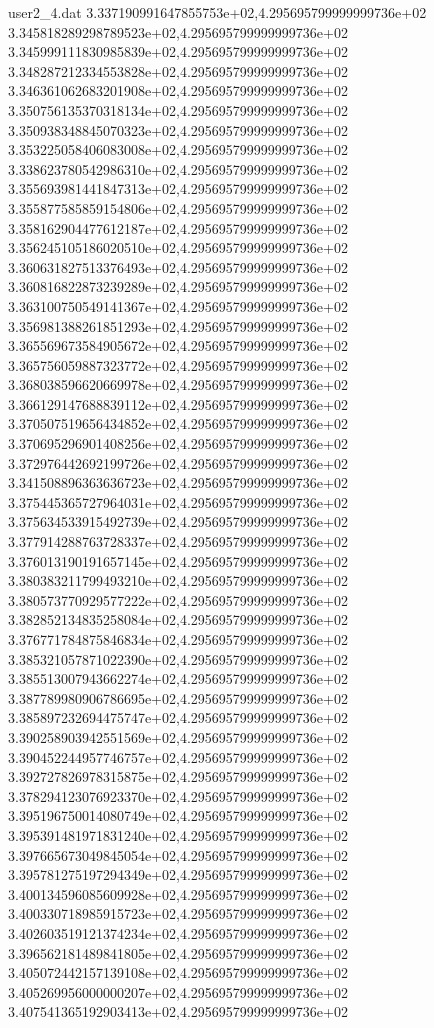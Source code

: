 \begin{filecontents}{user2_4.dat}
3.337190991647855753e+02,4.295695799999999736e+02
3.345818289298789523e+02,4.295695799999999736e+02
3.345999111830985839e+02,4.295695799999999736e+02
3.348287212334553828e+02,4.295695799999999736e+02
3.346361062683201908e+02,4.295695799999999736e+02
3.350756135370318134e+02,4.295695799999999736e+02
3.350938348845070323e+02,4.295695799999999736e+02
3.353225058406083008e+02,4.295695799999999736e+02
3.338623780542986310e+02,4.295695799999999736e+02
3.355693981441847313e+02,4.295695799999999736e+02
3.355877585859154806e+02,4.295695799999999736e+02
3.358162904477612187e+02,4.295695799999999736e+02
3.356245105186020510e+02,4.295695799999999736e+02
3.360631827513376493e+02,4.295695799999999736e+02
3.360816822873239289e+02,4.295695799999999736e+02
3.363100750549141367e+02,4.295695799999999736e+02
3.356981388261851293e+02,4.295695799999999736e+02
3.365569673584905672e+02,4.295695799999999736e+02
3.365756059887323772e+02,4.295695799999999736e+02
3.368038596620669978e+02,4.295695799999999736e+02
3.366129147688839112e+02,4.295695799999999736e+02
3.370507519656434852e+02,4.295695799999999736e+02
3.370695296901408256e+02,4.295695799999999736e+02
3.372976442692199726e+02,4.295695799999999736e+02
3.341508896363636723e+02,4.295695799999999736e+02
3.375445365727964031e+02,4.295695799999999736e+02
3.375634533915492739e+02,4.295695799999999736e+02
3.377914288763728337e+02,4.295695799999999736e+02
3.376013190191657145e+02,4.295695799999999736e+02
3.380383211799493210e+02,4.295695799999999736e+02
3.380573770929577222e+02,4.295695799999999736e+02
3.382852134835258084e+02,4.295695799999999736e+02
3.376771784875846834e+02,4.295695799999999736e+02
3.385321057871022390e+02,4.295695799999999736e+02
3.385513007943662274e+02,4.295695799999999736e+02
3.387789980906786695e+02,4.295695799999999736e+02
3.385897232694475747e+02,4.295695799999999736e+02
3.390258903942551569e+02,4.295695799999999736e+02
3.390452244957746757e+02,4.295695799999999736e+02
3.392727826978315875e+02,4.295695799999999736e+02
3.378294123076923370e+02,4.295695799999999736e+02
3.395196750014080749e+02,4.295695799999999736e+02
3.395391481971831240e+02,4.295695799999999736e+02
3.397665673049845054e+02,4.295695799999999736e+02
3.395781275197294349e+02,4.295695799999999736e+02
3.400134596085609928e+02,4.295695799999999736e+02
3.400330718985915723e+02,4.295695799999999736e+02
3.402603519121374234e+02,4.295695799999999736e+02
3.396562181489841805e+02,4.295695799999999736e+02
3.405072442157139108e+02,4.295695799999999736e+02
3.405269956000000207e+02,4.295695799999999736e+02
3.407541365192903413e+02,4.295695799999999736e+02

\end{filecontents}
